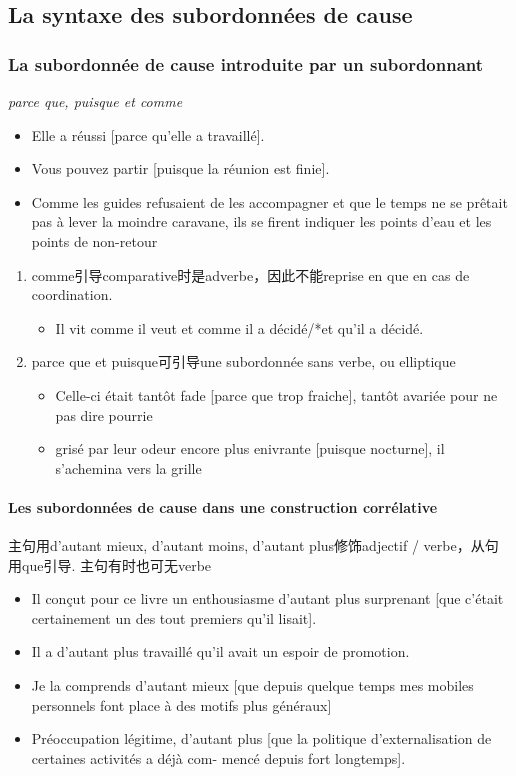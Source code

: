 \documentclass[UTF8]{report}
\begin{document}
\subsection{La syntaxe des subordonnées de cause}
\subsubsection{La subordonnée de cause introduite par un subordonnant}
\textit{parce que, puisque et comme}
\begin{itemize}
    \item Elle a réussi [parce qu’elle a travaillé].
    \item Vous pouvez partir [puisque la réunion est finie].
    \item Comme les guides refusaient de les accompagner et que le temps ne se prêtait pas à lever la moindre caravane, ils se firent indiquer les points d’eau et les points de non-retour 
\end{itemize}

\begin{enumerate}
    \item comme引导comparative时是adverbe，因此不能reprise en que en cas de coordination.
    \begin{itemize}
        \item Il vit comme il veut et comme il a décidé/*et qu’il a décidé.
    \end{itemize}
    \item parce que et puisque可引导une subordonnée sans verbe, ou elliptique
    \begin{itemize}
        \item Celle-ci était tantôt fade [parce que trop fraiche], tantôt avariée pour ne pas dire pourrie
        \item grisé par leur odeur encore plus enivrante [puisque nocturne], il s’achemina vers la grille
    \end{itemize}
\end{enumerate}

\paragraph{Les subordonnées de cause dans une construction corrélative}
主句用d’autant mieux, d’autant moins, d’autant plus修饰adjectif / verbe，从句用que引导. 主句有时也可无verbe
\begin{itemize}
    \item Il conçut pour ce livre un enthousiasme d’autant plus surprenant [que c’était certainement un des tout premiers qu’il lisait].
    \item Il a d’autant plus travaillé qu’il avait un espoir de promotion.
    \item Je la comprends d’autant mieux [que depuis quelque temps mes mobiles personnels font place à des motifs plus généraux]
    \item Préoccupation légitime, d’autant plus [que la politique d’externalisation de certaines activités a déjà com- mencé depuis fort longtemps]. 
\end{itemize}
\end{document}

